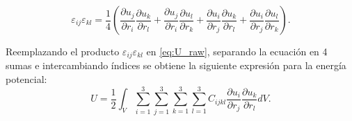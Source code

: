 \documentclass[12pt]{article}
\begin{document}
\begin{equation}
	\varepsilon_{ij}\varepsilon_{kl} = \frac{1}{4} \left(\frac{\partial u_j}{\partial r_i} \frac{\partial u_k}{\partial r_l} + \frac{\partial u_j}{\partial r_i} \frac{\partial u_l}{\partial r_k}+\frac{\partial u_i}{\partial r_j} \frac{\partial u_k}{\partial r_l}+\frac{\partial u_i}{\partial r_j} \frac{\partial u_l}{\partial r_k} \right).
\end{equation}

Reemplazando el producto $\varepsilon_{ij}\varepsilon_{kl}$ en \ref{eq:U_raw}, separando la ecuación en 4 sumas e intercambiando índices se obtiene la siguiente expresión para la energía potencial:
\begin{equation}
	U = \frac{1}{2} \int_{V}{\sum_{i=1}^{3}\sum_{j=1}^{3}\sum_{k=1}^{3}\sum_{l=1}^{3}{C_{ijkl}\frac{\partial u_i}{\partial r_j} \frac{\partial u_k}{\partial r_l}}dV}.
	\label{eq:U_cooked}
\end{equation}
\end{document}
